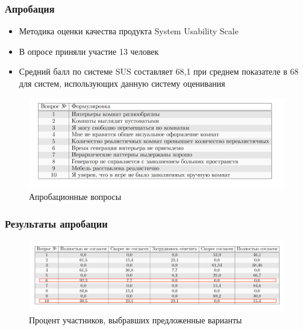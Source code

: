 \documentclass{beamer}
\begin{document}
\begin{frame}[t]
  \frametitle{Апробация}
    \begin{itemize}
        \item Методика оценки качества продукта System Usability Scale
        \item В опросе приняли участие 13 человек  
        \item Средний балл по системе SUS составляет 68,1 при среднем показателе в 68 для систем, использующих данную систему оценивания
      \end{itemize} 
      \begin{figure}
      \centering
        \includegraphics[width=\textwidth]{pictures/questions.png}
        \caption{Апробационные вопросы}
    \end{figure}
   
\end{frame}

\begin{frame}[t]
    \frametitle{Результаты апробации}
    \vspace*{\fill}
    \begin{figure}
      \centering
        \includegraphics[width=\textwidth]{pictures/experiment.png}
        \caption{Процент участников, выбравших предложенные варианты}
    \end{figure}
    \vspace*{\fill}
\end{frame}
\end{document}
